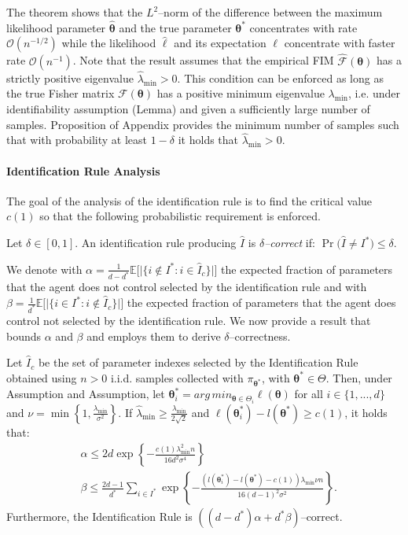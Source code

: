 \documentclass[letterpaper]{article} %
\begin{document}
The theorem shows that the $L^2$--norm of the difference between the maximum likelihood parameter $\widehat{\mathbf{\theta}}$ and the true parameter ${\mathbf{\theta}^*}$ concentrates with rate $\mathcal{O}(n^{-1/2})$ while the likelihood $\widehat{\ell}$ and its expectation $\ell$ concentrate with faster rate $\mathcal{O}(n^{-1})$. 
Note that the result assumes that the empirical FIM $\widehat{\mathcal{F}}(\mathbf{\theta})$ has a strictly positive eigenvalue $\widehat{\lambda}_{\min} > 0$. This condition can be enforced as long as the true Fisher matrix ${\mathcal{F}}(\mathbf{\theta})$ has a positive minimum eigenvalue $\lambda_{\min}$, i.e. under identifiability assumption (Lemma) and given a sufficiently large number of samples. Proposition of Appendix provides the minimum number of samples such that 
with probability at least $1-\delta$ it holds that $\widehat{\lambda}_{\min} > 0$.

\paragraph{Identification Rule Analysis} The goal of the analysis of the identification rule is to find the critical value $c(1)$ so that the following probabilistic requirement is enforced.

Let $\delta \in [0,1]$. An identification rule producing $\widehat{{I}}$ is \emph{$\delta$--correct} if: $\Pr \big( \widehat{{I}} \neq {I}^* \big)\le \delta$. 


 We denote with $\alpha = \frac{1}{d-d^*} \mathbb{E} \big[ \big| \big\{ i \notin I^* : i \in \widehat{I}_{c} \big\} \big| \big]$ the expected fraction of parameters that the agent does not control selected by the identification rule and with $\beta = \frac{1}{d^*} \mathbb{E} \big[ \big| \big\{ i \in I^* : i \notin \widehat{I}_{c} \big\} \big| \big]$ the expected fraction of parameters that the agent does  control not selected by the identification rule.
We now provide a result that bounds $\alpha$ and $\beta$ and employs them to derive $\delta$--correctness.

	Let $\widehat{I}_{c}$ be the set of parameter indexes selected by the Identification Rule obtained using $n>0$ i.i.d. samples collected with $\pi_{\mathbf{\theta}^*}$, with $\mathbf{\theta}^* \in \Theta$. Then, under Assumption and Assumption, let ${\mathbf{\theta}}_i^* = arg\,min_{\mathbf{\theta} \in \Theta_i} \ell(\mathbf{\theta})$ for all $i \in \{1,...,d\}$ and $\nu = \min \left\{1, \frac{\lambda_{\min}}{\sigma^2} \right\}$. If $\widehat{\lambda}_{\min} \ge \frac{\lambda_{\min}}{2\sqrt{2}}$ and $\ell({\mathbf{\theta}}_i^*) - {l}({\mathbf{\theta}^*}) \ge c(1)$, it holds that:
	{
	\begin{align*}
		&\alpha  \le 2d \exp \left\{ -\frac{c(1) {\lambda}_{\min}^2 n}{16d^2 \sigma^4} \right\}\\
		&\beta \le \frac{2d - 1}{d^*} \sum_{i \in I^*} \exp\left\{ - \frac{ \left( {l}({\mathbf{\theta}}_i^*) - {l}({\mathbf{\theta}^*}) - c(1) \right) {\lambda}_{\min} \nu n}{16(d-1)^2 \sigma^2 } \right\}.
	\end{align*}
	}
	Furthermore, the Identification Rule is $\left((d-d^*)\alpha +d^*\beta\right)$--correct.
\end{document}
